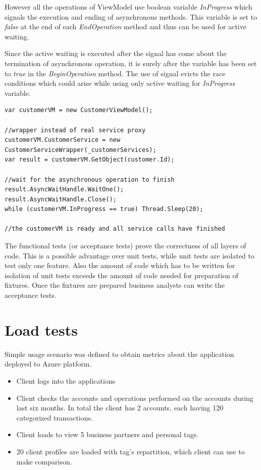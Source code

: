 However all the operations of ViewModel use boolean variable \textit{InProgress} which signals the execution and ending of asynchronous methods. This variable is set to \textit{false} at the end of each \textit{EndOperation} method and thus can be used for active waiting.

Since the active waiting is executed after the signal has come about the termination of asynchronous operation, it is surely after the variable has been set to \textit{true} in the \textit{BeginOperation} method. The use of signal evicts the race conditions which could arise while using only active waiting for \textit{InProgress} variable.

\begin{verbatim}
var customerVM = new CustomerViewModel();

//wrapper instead of real service proxy
customerVM.CustomerService = new CustomerServiceWrapper(_customerServices);
var result = customerVM.GetObject(customer.Id);

//wait for the asynchronous operation to finish
result.AsyncWaitHandle.WaitOne();
result.AsyncWaitHandle.Close();
while (customerVM.InProgress == true) Thread.Sleep(20);

//the customerVM is ready and all service calls have finished
\end{verbatim}

The functional tests (or acceptance tests) prove the correctness of all layers of code. This is a possible advantage over unit tests, while unit tests are isolated to test only one feature. Also the amount of code which has to be written for isolation of unit tests exceeds the amount of code needed for preparation of fixtures. Once the fixtures are prepared business analysts can write the acceptance tests.

\section{Load tests}
Simple usage scenario was defined to obtain metrics about the application deployed to Azure platform.

\begin{itemize}
	\item Client logs into the applications
	\item Client checks the accounts and operations performed on the accounts during last six months. In total the client has 2 accounts, each having 120 categorized transactions.
	\item Client loads to view 5 business partners and personal tags.
	\item 20 client profiles are loaded with tag's repartition, which client can use to make comparison.
\end{itemize}

